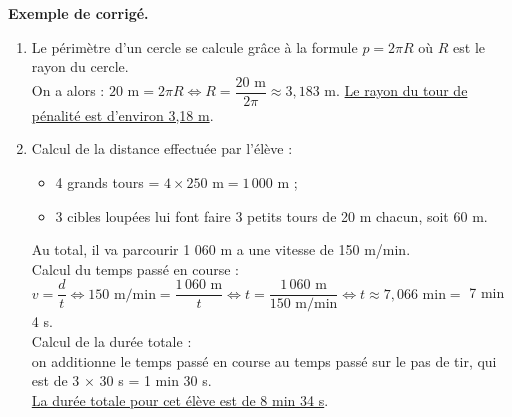 {\begin{activite}
   \textcolor{G1}{
   {\bf Exemple de corrigé.} \smallskip
      \begin{enumerate}
         \item Le périmètre d'un cercle se calcule grâce à la formule $p =2\pi R$ où $R$ est le rayon du cercle. \\ [1mm]
            On a alors : $20\text{ m} =2\pi R \iff R =\dfrac{20\text{ m}}{2\pi} \approx3,183$ m. \uline{Le rayon du tour de pénalité est d'environ 3,18 m}. \smallskip
         \item Calcul de la distance effectuée par l'élève :
               \begin{itemize}
                  \item 4 grands tours = $4\times250\text{ m} =1\,000\text{ m}$ ;
                  \item 3 cibles loupées lui font faire 3 petits tours de 20 m chacun, soit 60 m.
               \end{itemize}
            Au total, il va parcourir 1 060 m a une vitesse de 150 m/min. \\ 
            Calcul du temps passé en course : \\ [1mm]
            $v =\dfrac{d}{t} \iff 150\text{ m/min} =\dfrac{1\,060\text{ m}}{t} \iff t =\dfrac{1\,060\text{ m}}{150\text{ m/min}} \iff t \approx 7,066\text{ min} =$ 7 min 4 s. \\ [1mm]
            Calcul de la durée totale : \\
            on additionne le temps passé en course au temps passé sur le pas de tir, qui est de 3 $\times$ 30 s = 1 min 30 s. \\
            \uline{La durée totale pour cet élève est de 8 min 34 s}.
      \end{enumerate}}
\end{activite}


}
